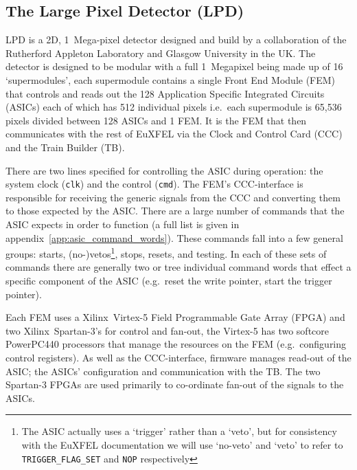 \subsection{The Large Pixel Detector (LPD)} %
\label{sub:the_large_pixel_detector_lpd}
LPD is a 2D, 1~Mega-pixel detector designed and build by a collaboration of the Rutherford Appleton Laboratory and Glasgow University in the UK. The detector is designed to be modular with a full 1~Megapixel being made up of 16 `supermodules', each supermodule contains a single Front End Module (FEM) that controls and reads out the 128 Application Specific Integrated Circuits (ASICs) each of which has 512 individual pixels i.e.\ each supermodule is 65,536 pixels divided between 128 ASICs and 1 FEM. It is the FEM that then communicates with the rest of EuXFEL via the Clock and Control Card (CCC) and the Train Builder (TB).
    
There are two lines specified for controlling the ASIC during operation: the system clock (\texttt{clk}) and the control (\texttt{cmd}). The FEM's CCC-interface is responsible for receiving the generic signals from the CCC and converting them to those expected by the ASIC. There are a large number of commands that the ASIC expects in order to function (a full list is given in appendix~\ref{app:asic_command_words}). These commands fall into a few general groups: starts, (no-)vetos\footnote{The ASIC actually uses a `trigger' rather than a `veto', but for consistency with the EuXFEL documentation we will use `no-veto' and `veto' to refer to \texttt{TRIGGER\_FLAG\_SET} and \texttt{NOP} respectively}, stops, resets, and testing. In each of these sets of commands there are generally two or tree individual command words that effect a specific component of the ASIC (e.g.\ reset the write pointer, start the trigger pointer). 
    
Each FEM uses a Xilinx~Virtex-5 Field Programmable Gate Array (FPGA) and two Xilinx~Spartan-3's for control and fan-out, the Virtex-5 has two softcore PowerPC440 processors that manage the resources on the FEM (e.g.\ configuring control registers). As well as the CCC-interface, firmware manages read-out of the ASIC; the ASICs' configuration and communication with the TB. The two Spartan-3 FPGAs are used primarily to co-ordinate fan-out of the signals to the ASICs.
